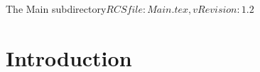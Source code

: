 %   

\begin{cactuspart}{5}{The Main subdirectory}{$RCSfile: Main.tex,v $}{$Revision: 1.2 $}
\renewcommand{\thepage}{\Alph{part}\arabic{page}}

\chapter{Introduction}


\end{cactuspart}
